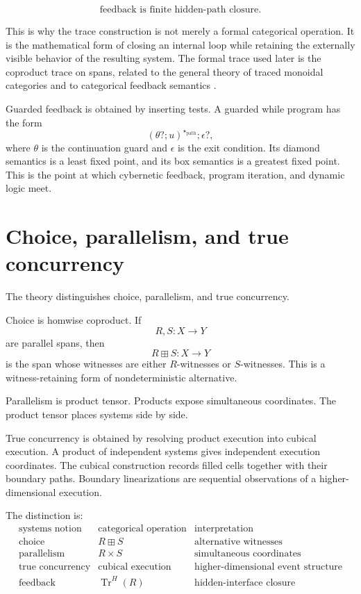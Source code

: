 \[
  \boxed{
  \text{feedback is finite hidden-path closure.}
  }
\]

This is why the trace construction is not merely a formal categorical
operation.  It is the mathematical form of closing an internal loop while
retaining the externally visible behavior of the resulting system.  The
formal trace used later is the coproduct trace on spans, related to the
general theory of traced monoidal categories
\cite{JoyalStreetVerity1996TracedMonoidalCategories} and to categorical
feedback semantics
\cite{KatisSabadiniWalters2002FeedbackTraceFixedPoint}.

Guarded feedback is obtained by inserting tests.  A guarded while program has
the form
\[
  (\theta?;u)^{\star_{\mathrm{path}}};\epsilon?,
\]
where \(\theta\) is the continuation guard and \(\epsilon\) is the exit
condition.  Its diamond semantics is a least fixed point, and its box
semantics is a greatest fixed point.  This is the point at which cybernetic
feedback, program iteration, and dynamic logic meet.

\section{Choice, parallelism, and true concurrency}
\label{sec:choice-parallelism-true-concurrency}

The theory distinguishes choice, parallelism, and true concurrency.

Choice is homwise coproduct.  If
\[
  R,S:X\to Y
\]
are parallel spans, then
\[
  R\boxplus S:X\to Y
\]
is the span whose witnesses are either \(R\)-witnesses or \(S\)-witnesses.
This is a witness-retaining form of nondeterministic alternative.

Parallelism is product tensor.  Products expose simultaneous coordinates.  The
product tensor places systems side by side.

True concurrency is obtained by resolving product execution into cubical
execution.  A product of independent systems gives independent execution
coordinates.  The cubical construction records filled cells together with
their boundary paths.  Boundary linearizations are sequential observations of
a higher-dimensional execution.

The distinction is:
\[
\begin{array}{c|c|c}
\text{systems notion}
&
\text{categorical operation}
&
\text{interpretation}
\\
\hline
\text{choice}
&
R\boxplus S
&
\text{alternative witnesses}
\\
\text{parallelism}
&
R\times S
&
\text{simultaneous coordinates}
\\
\text{true concurrency}
&
\text{cubical execution}
&
\text{higher-dimensional event structure}
\\
\text{feedback}
&
\operatorname{Tr}^{H}(R)
&
\text{hidden-interface closure}
\end{array}
\]

